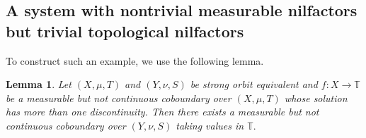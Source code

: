 \documentclass[12pt]{amsart}
\theoremstyle{definition}
\theoremstyle{plain}
\newtheorem{lemma}[theorem]{Lemma}
\theoremstyle{definition}
\numberwithin{equation}{section}
\begin{document}

\subsection{A system with nontrivial measurable nilfactors but trivial topological nilfactors} To construct such an example, we use the following lemma.






\begin{lemma}\label{measurable but not continuous coboundary over minimal cantor system}
    Let $(X,\mu,T)$ and $(Y,\nu,S)$ be strong orbit equivalent and $f\colon X \rightarrow \mathbb{T}$ be a measurable but not continuous coboundary over $(X,\mu,T)$ whose solution has more than one discontinuity. Then there exists a measurable but not continuous coboundary over $(Y,\nu,S)$ taking values in $\mathbb{T}.$
\end{lemma}
\end{document}
